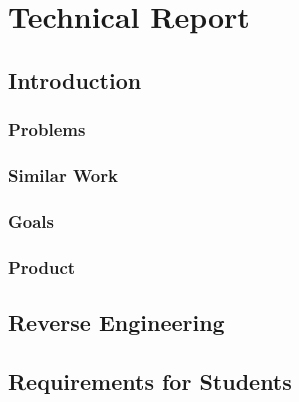 \chapter{Technical Report}
\section{Introduction}
\subsection{Problems}
\subsection{Similar Work}
\subsection{Goals}
\subsection{Product}
\section{Reverse Engineering}
\section{Requirements for Students}